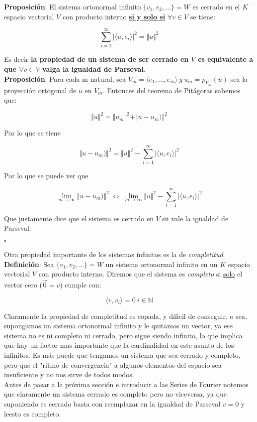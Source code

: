 \documentclass[a4paper,spanish]{article}
\def\N {\mathbb{N}}
\numberwithin{equation}{section}
\begin{document}
\textbf{Proposici\'on}: El sistema ortonormal infinito $\lbrace{v_1,v_2,\dots}\rbrace = W$ es cerrado en el $K$ espacio vectorial $V$ con producto interno \textbf{\underline{si y solo si}} $\forall v \in V$ se tiene:

\[\sum\limits_{i=1}^{\infty}\vert{\langle{u,e_i}\rangle}\vert^2 = \Vert{u}\Vert ^2\]

Es decir \textbf{la propiedad de un sistema de ser cerrado en $V$ es equivalente a que $\forall v \in V$ valga la igualdad de Parseval}.\\

\textbf{Proposici\'on}: Para cada m natural, sea $V_m=\langle{e_1,\dots,e_m}\rangle \ y \ u_m=p_{V_m}\left({u}\right)$ sea la proyecci\'on ortogonal de $u$ en $V_m$. Entonces del teorema de Pit\'agoras sabemos que:

\[ \Vert{u}\Vert^2=\Vert{u_m}\Vert^2 + \Vert{u-u_m)}\Vert^2\]

Por lo que se tiene

\[
\Vert{u-u_m)}\Vert^2 = \Vert{u}\Vert^2 - \sum\limits_{i=1}^{\infty}\vert{\langle{u,e_i}\rangle}\vert^2
\]

Por lo que se puede ver que

\[ \lim \limits _{m \rightarrow \infty}{\Vert{u-u_m)}\Vert^2} \ \Longleftrightarrow \ \lim \limits _{m \rightarrow \infty}{\Vert{u}\Vert^2 - \sum\limits_{i=1}^{\infty}\vert{\langle{u,e_i}\rangle}\vert^2
} \]

Que justamente dice que el sistema es cerrado en $V$ sii vale la igualdad de Parseval.

\begin{flushright}
$\square$
\end{flushright}

Otra propiedad importante de los sistemas infinitos es la de \textit{completitud}.\\

\textbf{Definici\'on}: Sea $\lbrace{v_1,v_2,\dots}\rbrace = W$ un sistema ortonormal infinito en un $K$ espacio vectorial $V$ con producto interno. Diremos que el sistema es \textit{completo} si \underline{solo} el vector cero ($\vec{0}=v$) cumple con:

\[\langle{v,v_i}\rangle=0 \ i \in \N\] 

Claramente la propiedad de completitud es copada, y d\'ificil de conseguir, o sea, supongamos un sistema ortonormal infinito y le quitamos un vector, ya ese sistema no es ni completo ni cerrado, pero sigue siendo infinito, lo que implica que hay un factor mas importante que la cardinalidad en este asunto de los infinitos. Es m\'as puede que tengamos un sistema que sea cerrado y completo, pero que el "ritmo de convergencia" a algunos elementos del espacio sea insuficiente y no nos sirve de todos modos.\\
Antes de pasar a la pr\'oxima secci\'on e introducir a las Series de Fourier notemos que claramente un sistema cerrado es completo pero no viceversa, ya que suponiendo es cerrado basta con reemplazar en la igualdad de Parseval $v=0$ y leesto es completo.
\end{document}

